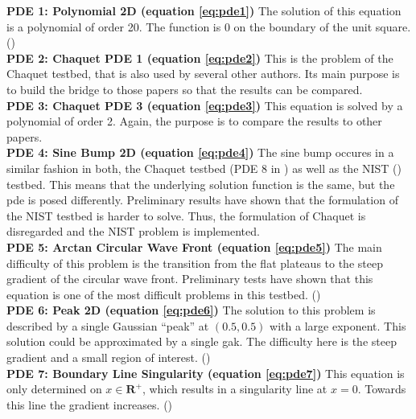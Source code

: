\documentclass[./\jobname.tex]{subfiles}
\begin{document}
\textbf{PDE 1: Polynomial 2D (equation \ref{eq:pde1})} The solution of this equation is a polynomial of order 20. The function is 0 on the boundary of the unit square. (\cite{mitchell_nist_2018}) \\

\textbf{PDE 2: Chaquet PDE 1 (equation \ref{eq:pde2})} This is the problem of the Chaquet testbed, that is also used by several other authors. Its main purpose is to build the bridge to those papers so that the results can be compared. \cite{chaquet_using_2019} \\

\textbf{PDE 3: Chaquet PDE 3 (equation \ref{eq:pde3})} This equation is solved by a polynomial of order 2. Again, the purpose is to compare the results to other papers. \cite{chaquet_using_2019} \\

\textbf{PDE 4: Sine Bump 2D (equation \ref{eq:pde4})} The sine bump occures in a similar fashion in both, the Chaquet testbed (PDE 8 in \cite{chaquet_using_2019}) as well as the NIST (\cite{mitchell_nist_2018}) testbed. This means that the underlying solution function is the same, but the \gls{pde} is posed differently. Preliminary results have shown that the formulation of the NIST testbed is harder to solve. Thus, the formulation of Chaquet is disregarded and the NIST problem is implemented. \\

\textbf{PDE 5: Arctan Circular Wave Front (equation \ref{eq:pde5})} The main difficulty of this problem is the transition from the flat plateaus to the steep gradient of the circular wave front. Preliminary tests have shown that this equation is one of the most difficult problems in this testbed. (\cite{mitchell_nist_2018})\\

\textbf{PDE 6: Peak 2D (equation \ref{eq:pde6})} The solution to this problem is described by a single Gaussian ``peak'' at $(0.5, 0.5)$ with a large exponent. This solution could be approximated by a single \gls{gak}. The difficulty here is the steep gradient and a small region of interest. (\cite{mitchell_nist_2018})\\

\textbf{PDE 7: Boundary Line Singularity (equation \ref{eq:pde7})} This equation is only determined on $x \in \mathbf{R}^{+}$, which results in a singularity line at $x = 0$. Towards this line the gradient increases.  (\cite{mitchell_nist_2018})\\
\end{document}
